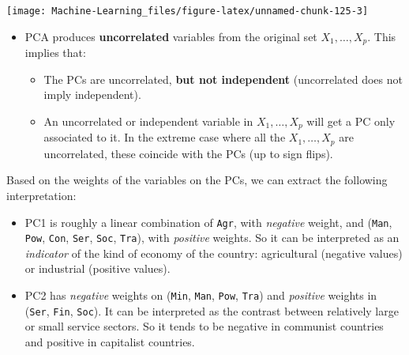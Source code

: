 \documentclass[]{book}
\newenvironment{Shaded}{\begin{snugshade}}{\end{snugshade}}
\newcommand{\DecValTok}[1]{\textcolor[rgb]{0.00,0.00,0.81}{#1}}
\newcommand{\CommentTok}[1]{\textcolor[rgb]{0.56,0.35,0.01}{\textit{#1}}}
\newcommand{\OperatorTok}[1]{\textcolor[rgb]{0.81,0.36,0.00}{\textbf{#1}}}
\newcommand{\NormalTok}[1]{#1}
\providecommand{\tightlist}{%
  \setlength{\itemsep}{0pt}\setlength{\parskip}{0pt}}
\newenvironment{rmdblock}[1]
  {\begin{shaded*}
  \begin{itemize}
  \renewcommand{\labelitemi}{
    \raisebox{-.7\height}[0pt][0pt]{
      {\setkeys{Gin}{width=2em,keepaspectratio}\texttt{[image: img/icons/\#1]}}
    }
  }
  \item
  }
  {
  \end{itemize}
  \end{shaded*}
  }
\newenvironment{rmdinsight}
  {\begin{rmdblock}{insight}}
  {\end{rmdblock}}
\theoremstyle{definition}
\theoremstyle{definition}
\theoremstyle{definition}
\theoremstyle{remark}
\begin{document}
\begin{center}\texttt{[image: Machine-Learning\_files/figure-latex/unnamed-chunk-125-3]} \end{center}

\begin{Shaded}
\end{Shaded}

\begin{rmdinsight}
PCA produces \textbf{uncorrelated} variables from the original set
\(X_1,\ldots,X_p\). This implies that:

\begin{itemize}
\tightlist
\item
  The PCs are uncorrelated, \textbf{but not independent} (uncorrelated
  does not imply independent).
\item
  An uncorrelated or independent variable in \(X_1,\ldots,X_p\) will get
  a PC only associated to it. In the extreme case where all the
  \(X_1,\ldots,X_p\) are uncorrelated, these coincide with the PCs (up
  to sign flips).
\end{itemize}
\end{rmdinsight}

Based on the weights of the variables on the PCs, we can extract the
following interpretation:

\begin{itemize}
\tightlist
\item
  PC1 is roughly a linear combination of \texttt{Agr}, with
  \emph{negative} weight, and (\texttt{Man}, \texttt{Pow}, \texttt{Con},
  \texttt{Ser}, \texttt{Soc}, \texttt{Tra}), with \emph{positive}
  weights. So it can be interpreted as an \emph{indicator} of the kind
  of economy of the country: agricultural (negative values) or
  industrial (positive values).
\item
  PC2 has \emph{negative} weights on (\texttt{Min}, \texttt{Man},
  \texttt{Pow}, \texttt{Tra}) and \emph{positive} weights in
  (\texttt{Ser}, \texttt{Fin}, \texttt{Soc}). It can be interpreted as
  the contrast between relatively large or small service sectors. So it
  tends to be negative in communist countries and positive in capitalist
  countries.
\end{itemize}
\end{document}
